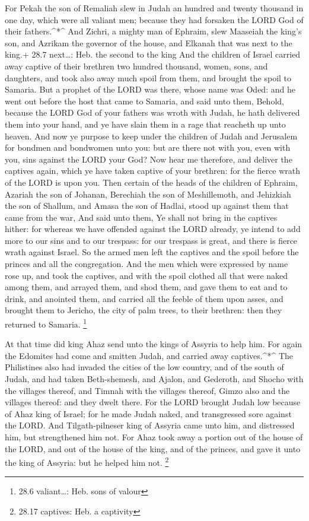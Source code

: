  For Pekah the son of Remaliah slew in Judah an hundred and
twenty thousand in one day, which were all valiant men; because they had
forsaken the LORD God of their fathers.\^{}*\^{}  And
Zichri, a mighty man of Ephraim, slew Maaseiah the king's son, and
Azrikam the governor of the house, and Elkanah that was next to the
king.+ 28.7 next\ldots: Heb. the second to the king  And the
children of Israel carried away captive of their brethren two hundred
thousand, women, sons, and daughters, and took also away much spoil from
them, and brought the spoil to Samaria.  But a prophet of
the LORD was there, whose name was Oded: and he went out before the host
that came to Samaria, and said unto them, Behold, because the LORD God
of your fathers was wroth with Judah, he hath delivered them into your
hand, and ye have slain them in a rage that reacheth up unto heaven.
 And now ye purpose to keep under the children of Judah and
Jerusalem for bondmen and bondwomen unto you: but are there not with
you, even with you, sins against the LORD your God?  Now
hear me therefore, and deliver the captives again, which ye have taken
captive of your brethren: for the fierce wrath of the LORD is upon you.
 Then certain of the heads of the children of Ephraim,
Azariah the son of Johanan, Berechiah the son of Meshillemoth, and
Jehizkiah the son of Shallum, and Amasa the son of Hadlai, stood up
against them that came from the war,  And said unto them,
Ye shall not bring in the captives hither: for whereas we have offended
against the LORD already, ye intend to add more to our sins and to our
trespass: for our trespass is great, and there is fierce wrath against
Israel.  So the armed men left the captives and the spoil
before the princes and all the congregation.  And the men
which were expressed by name rose up, and took the captives, and with
the spoil clothed all that were naked among them, and arrayed them, and
shod them, and gave them to eat and to drink, and anointed them, and
carried all the feeble of them upon asses, and brought them to Jericho,
the city of palm trees, to their brethren: then they returned to
Samaria. \footnote{28.6 valiant\ldots: Heb. sons of valour}

 At that time did king Ahaz send unto the kings of Assyria
to help him.  For again the Edomites had come and smitten
Judah, and carried away captives.\^{}*\^{}  The Philistines
also had invaded the cities of the low country, and of the south of
Judah, and had taken Beth-shemesh, and Ajalon, and Gederoth, and Shocho
with the villages thereof, and Timnah with the villages thereof, Gimzo
also and the villages thereof: and they dwelt there.  For
the LORD brought Judah low because of Ahaz king of Israel; for he made
Judah naked, and transgressed sore against the LORD.  And
Tilgath-pilneser king of Assyria came unto him, and distressed him, but
strengthened him not.  For Ahaz took away a portion out of
the house of the LORD, and out of the house of the king, and of the
princes, and gave it unto the king of Assyria: but he helped him not.
\footnote{28.17 captives: Heb. a captivity}

